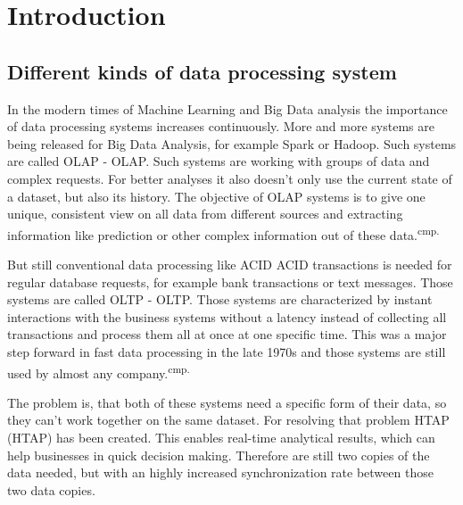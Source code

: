 
\chapter{Introduction}

\section{Different kinds of data processing system}

In the modern times of Machine Learning and Big Data analysis the importance of data processing systems increases continuously. More and more systems are being released for Big Data Analysis, for example Spark or Hadoop. Such systems are called \acs{OLAP} - \acl{OLAP}. Such systems are working with groups of data and complex requests. For better analyses it also doesn't only use the current state of a dataset, but also its history. The objective of OLAP systems is to give one unique, consistent view on all data from different sources and extracting information like prediction or other complex information out of these data.\textsuperscript{cmp.\cite{5}}


But still conventional data processing like \acs{ACID} \acl{ACID} transactions is needed for regular database requests, for example bank transactions or text messages. Those systems are called \acl{OLTP} - \acl{OLTP}. Those systems are characterized by instant interactions with the business systems without a latency instead of collecting all transactions and process them all at once at one specific time. This was a major step forward in fast data processing in the late 1970s and those systems are still used by almost any company.\textsuperscript{cmp.\cite{6}}


The problem is, that both of these systems need a specific form of their data, so they can't work together on the same dataset. For resolving that problem \acs{HTAP} (\acl{HTAP}) has been created. This enables real-time analytical results, which can help businesses in quick decision making. Therefore are still two copies of the data needed, but with an highly increased synchronization rate between those two data copies.

